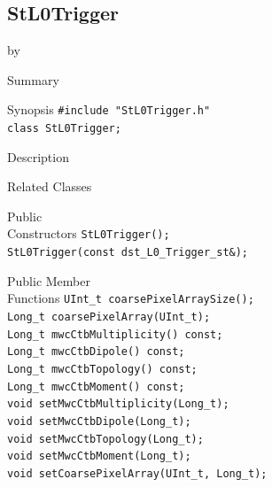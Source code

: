 \documentclass[twoside]{article}
\newcommand{\entrylabel}[1]{\mbox{\textbf{{#1}}}\hfil}%
\newenvironment{entry}
{\begin{list}{}%
    {\renewcommand{\makelabel}{\entrylabel}%
     \setlength{\labelwidth}{90pt}%
     \setlength{\leftmargin}{\labelwidth}
     \advance\leftmargin by \labelsep%
      }%
    }%
  {\end{list}}
\newcommand{\Entrylabel}[1]%
{\raisebox{0pt}[1ex][0pt]{\makebox[\labelwidth][l]%
    {\parbox[t]{\labelwidth}{\hspace{0pt}\textbf{{#1}}}}}}
\newenvironment{Entry}%
{\renewcommand{\entrylabel}{\Entrylabel}\begin{entry}}%
  {\end{entry}}
\begin{document}
\subsection{StL0Trigger}
\label{sec:StL0Trigger}
\begin{Entry}
\item[Summary]
\item[Synopsis]
    \verb+#include "StL0Trigger.h"+\\
    \verb+class StL0Trigger;+\\
\item[Description]
\item[Related Classes]
\item[Public\\ Constructors]
    \verb+StL0Trigger();+\\
    \verb+StL0Trigger(const dst_L0_Trigger_st&);+\\
\item[Public Member\\ Functions]
    \verb+UInt_t coarsePixelArraySize();+\\
    \verb+Long_t coarsePixelArray(UInt_t);+\\
    \verb+Long_t mwcCtbMultiplicity() const;+\\
    \verb+Long_t mwcCtbDipole() const;+\\
    \verb+Long_t mwcCtbTopology() const;+\\
    \verb+Long_t mwcCtbMoment() const;+\\
    
    \verb+void setMwcCtbMultiplicity(Long_t);+\\
    \verb+void setMwcCtbDipole(Long_t);+\\
    \verb+void setMwcCtbTopology(Long_t);+\\
    \verb+void setMwcCtbMoment(Long_t);+\\
    \verb+void setCoarsePixelArray(UInt_t, Long_t);+\\
\end{Entry}
\clearpage
\end{document}
